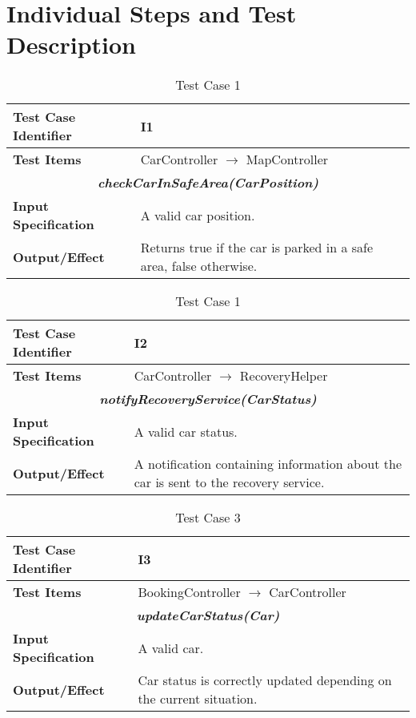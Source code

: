 
\chapter{Individual Steps and Test Description}
\blindtext

\begin{table}[h]
	\begin{tabularx}{\textwidth}{l X}
		\hline
		\textbf{Test Case Identifier}	&	I1\\	\hline
		\textbf{Test Items}			&	CarController $\rightarrow$ MapController \\	\hline\hline
		\multicolumn{2}{c}{\textbf{\textit{checkCarInSafeArea(CarPosition)}}}	\\	\hline
			\textbf{Input Specification}	&	A valid car position.\\	\hline
			\textbf{Output/Effect}	&	Returns true if the car is parked in a safe area, false otherwise.\\	\hline\hline
	\end{tabularx}
	\captionsetup{textformat=empty,labelformat=blank}
	\caption{Test Case 1}
	\label{table:template-table-1}
\end{table}

\begin{table}[h]
	\begin{tabularx}{\textwidth}{l X}
		\hline
		\textbf{Test Case Identifier}	&	I2\\	\hline
		\textbf{Test Items}			&	CarController $\rightarrow$ RecoveryHelper \\	\hline\hline
		\multicolumn{2}{c}{\textbf{\textit{notifyRecoveryService(CarStatus)}}}	\\	\hline
			\textbf{Input Specification}	&	A valid car status.\\	\hline
			\textbf{Output/Effect}	&	A notification containing information about the car is sent to the recovery service.\\	\hline\hline
	\end{tabularx}
	\captionsetup{textformat=empty,labelformat=blank}
	\caption{Test Case 1}
	\label{table:template-table-2}
\end{table}

\begin{table}[h]
	\begin{tabularx}{\textwidth}{l X}
		\hline
		\textbf{Test Case Identifier}	&	I3\\	\hline
		\textbf{Test Items}			&	BookingController $\rightarrow$ CarController \\	\hline\hline
		\multicolumn{2}{c}{\textbf{\textit{updateCarStatus(Car)}}}	\\	\hline
			\textbf{Input Specification}	&	A valid car.\\	\hline
			\textbf{Output/Effect}	&	Car status is correctly updated depending on the current situation.\\	\hline\hline
	\end{tabularx}
	\captionsetup{textformat=empty,labelformat=blank}
	\caption{Test Case 3}
	\label{table:template-table-3}
\end{table}


